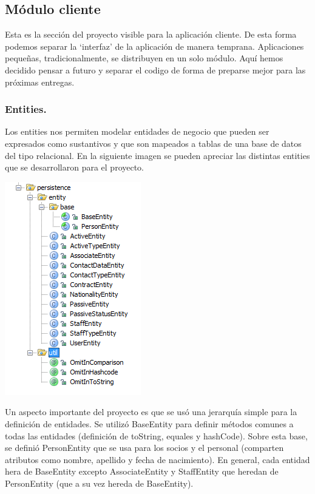 \documentclass[letter]{article}
\begin{document}
\newpage
\subsection{Módulo cliente}

Esta es la sección del proyecto visible para la aplicación cliente. De esta forma podemos separar la `interfaz' de la aplicación de manera temprana. Aplicaciones pequeñas, tradicionalmente, se distribuyen en un solo módulo. Aquí hemos decidido pensar a futuro y separar el codigo de forma de preparse mejor para las próximas entregas.

\subsubsection{Entities.}

Los entities nos permiten modelar entidades de negocio que pueden ser expresados como sustantivos y que son mapeados a tablas de una base de datos del tipo relacional. En la siguiente imagen se pueden apreciar las distintas entities que se desarrollaron para el proyecto.
\begin{center}
  \includegraphics{images/cliente-persistence.png}
\end{center}
Un aspecto importante del proyecto es que se usó una jerarquía simple para la definición de entidades. Se utilizó BaseEntity para definir métodos comunes a todas las entidades (definición de toString, equales y hashCode). Sobre esta base, se definió PersonEntity que se usa para los socios y el personal (comparten atributos como nombre, apellido y fecha de nacimiento). En general, cada entidad hera de BaseEntity excepto AssociateEntity y StaffEntity que heredan de PersonEntity (que a su vez hereda de BaseEntity).
\end{document}
